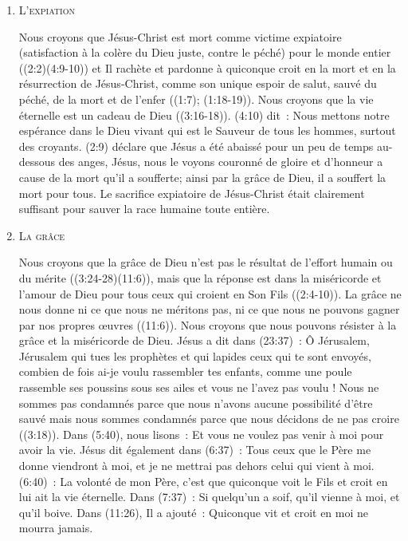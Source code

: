 \begin{enumerate}
  \item  \textsc{L'expiation}

Nous croyons que Jésus-Christ est mort comme victime expiatoire
 (satisfaction à la colère du Dieu juste, contre le péché)
 \og pour le monde entier \fg{} ((2:2)(4:9-10))
 et Il rachète et pardonne à quiconque croit en la mort et en la résurrection
 de Jésus-Christ, comme son unique espoir de salut, sauvé du péché,
 de la mort et de l'enfer ((1:7); (1:18-19)).
 Nous croyons que la vie éternelle est un cadeau de Dieu ((3:16-18)).
 (4:10) dit~:
 \og Nous mettons notre espérance dans le Dieu vivant qui est le Sauveur de tous les hommes,
 surtout des croyants. \fg{}
 (2:9) déclare que Jésus \og a été abaissé pour un peu de temps au-dessous des anges,
 Jésus, nous le voyons couronné de gloire et d'honneur a cause de la mort qu'il a soufferte;
 ainsi par la grâce de Dieu, il a souffert la mort pour tous. \fg{}
 Le sacrifice expiatoire de Jésus-Christ était clairement suffisant pour sauver
 la race humaine toute entière.


  \item  \textsc{La grâce}

Nous croyons que la grâce de Dieu n'est pas le résultat de l'effort humain ou du mérite
 ((3:24-28)(11:6)), mais que la réponse est dans la miséricorde et l'amour
 de Dieu pour tous ceux qui croient en Son Fils ((2:4-10)).
 La grâce ne nous donne ni ce que nous ne méritons pas, ni ce que nous ne pouvons gagner
 par nos propres œuvres ((11:6)).
 Nous croyons que nous pouvons résister à la grâce et la miséricorde de Dieu.
 Jésus a dit dans (23:37)~: \og Ô Jérusalem, Jérusalem qui tues les prophètes
 et qui lapides ceux qui te sont envoyés, combien de fois ai-je voulu rassembler tes enfants,
 comme une poule rassemble ses poussins sous ses ailes et vous ne l'avez pas voulu ! \fg{}
 Nous ne sommes pas condamnés parce que nous n'avons aucune possibilité d'être sauvé
 mais nous sommes condamnés parce que nous décidons de ne pas croire ((3:18)).
 Dans (5:40), nous lisons~:
 \og Et vous ne voulez pas venir à moi pour avoir la vie. \fg{}
 Jésus dit également dans (6:37)~: \og Tous ceux que le Père me donne viendront à moi,
 et je ne mettrai pas dehors celui qui vient à moi. \fg{}
 (6:40)~: \og La volonté de mon Père, c'est que quiconque voit le Fils
 et croit en lui ait la vie éternelle. \fg{}
 Dans (7:37)~: \og Si quelqu'un a soif, qu'il vienne à moi, et qu'il boive. \fg{}
 Dans (11:26), Il a ajouté~: \og Quiconque vit et croit en moi ne mourra jamais. \fg{}


\end{enumerate}
